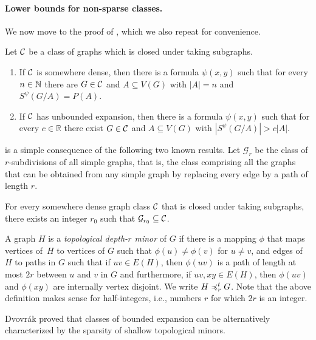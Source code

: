 \paragraph*{Lower bounds for non-sparse classes.}
We now move to the proof of , which we also repeat for
convenience.

\begin{theorem}
Let $\mathcal{C}$ be a class of graphs which 
is closed under taking subgraphs. 
\begin{enumerate}[(1)]
\item If $\mathcal{C}$ is somewhere dense, then there is a formula 
$\psi(x,y)$ such that for every $n\in \mathbb{N}$ there are $G\in\mathcal{C}$ and $A\subseteq V(G)$ 
with $|A|=n$ and $S^\psi(G/A)=P(A)$. 
\item If $\mathcal{C}$ has unbounded expansion, then there is a formula 
$\psi(x,y)$ such that for every $c\in \mathbb{R}$ there exist $G\in\mathcal{C}$ and $A\subseteq V(G)$ with $|S^\psi(G/A)|>c|A|$. 
\end{enumerate}
\end{theorem}

 is a simple consequence of the following two
known results. 
Let $\mathcal{G}_r$ be the class of $r$-subdivisions of all 
simple graphs, that is, the class comprising
all the graphs that can be obtained from any simple graph by replacing every edge by a path of
length $r$.

\begin{lemma}\label{lem:lower-nd}
For every somewhere dense graph class $\mathcal{C}$ that is closed 
under taking subgraphs, there
exists an integer $r_0$ such that $\mathcal{G}_{r_0}\subseteq \mathcal{C}$.
\end{lemma}

A graph $H$ is a \emph{topological depth-$r$ minor} of $G$ if
there is a mapping $\phi$ that maps vertices of~$H$ to 
vertices of $G$ such that $\phi(u)\neq \phi(v)$ for 
$u\neq v$, and edges of $H$ to paths in 
$G$ such that if $uv\in E(H)$, then $\phi(uv)$
is a path of length at most $2r$ between $u$ and $v$ in 
$G$ and furthermore, if $uv, xy\in E(H)$, then 
$\phi(uv)$ and $\phi(xy)$ are internally vertex
disjoint. We write $H\preccurlyeq_r^t G$. 
Note that the above definition makes sense for 
half-integers, i.e., numbers $r$ for which $2r$ is an integer.

Dvov{r}\'ak proved that classes of bounded expansion can be alternatively characterized by the sparsity of shallow topological minors.

